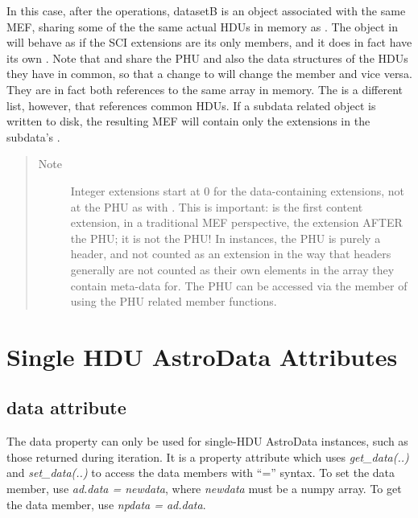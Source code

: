 \documentclass[letterpaper,10pt,english]{sphinxmanual}
\begin{document}
\begin{fulllineitems}
In this case, after the operations, datasetB is an  object
associated with the same MEF, sharing some of the the same actual HDUs
in memory as . The object in  will behave as if the
SCI extensions are its only members, and it does in fact have its own
. Note that  and  share the PHU and also
the data structures of the HDUs they have in common, so that a change
to  will change the 
 member and vice versa. They are in fact both
references to the same  array in memory. The  is a 
different list, however, that references common HDUs. If a subdata 
related  object is written to disk, the resulting MEF will
contain only the extensions in the subdata's .
\begin{quote}\begin{description}
\item[{Note }] \leavevmode
Integer extensions start at 0 for the data-containing 
extensions, not at the PHU as with .  This is important:
 is the first content extension, in a traditional MEF 
perspective, the extension AFTER the PHU; it is not the PHU!  In
 instances, the PHU is purely a header, and not counted
as an extension in the way that headers generally are not counted
as their own elements in the array they contain meta-data for.
The PHU can be accessed via the   member of using
the PHU related member functions.

\end{description}\end{quote}

\end{fulllineitems}



\section{Single HDU AstroData Attributes}
\label{chapter_AstroDataClass:single-hdu-astrodata-attributes}

\subsection{data attribute}
\label{chapter_AstroDataClass:data-attribute}

\begin{fulllineitems}
\label{chapter_AstroDataClass:astrodata.data.AstroData.data}
The data property can only be used for single-HDU AstroData
instances, such as those returned during iteration. It is a property
attribute which uses \emph{get\_data(..)} and \emph{set\_data(..)} to access the
data members with ``='' syntax. To set the data member, use \emph{ad.data =
newdata}, where \emph{newdata} must be a numpy array. To get the data
member, use \emph{npdata = ad.data}.

\end{fulllineitems}
\end{document}
